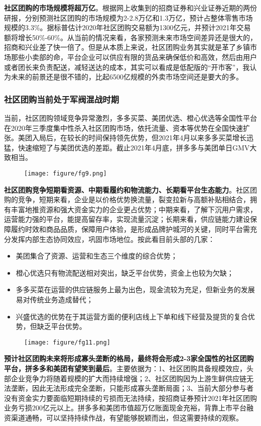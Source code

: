 \documentclass[UTF8,a4paper,12pt,lang=cn,fontset = windows]{elegantpaper} %
\begin{document}
\textbf{社区团购的市场规模将超万亿}。根据网上收集到的招商证券和兴业证券近期的两份研报，分别预测社区团购的市场规模为2-2.8万亿和1.3万亿，预计占整体零售市场规模的3.3\%。据标普估计2020年社区团购交易额为1300亿元，并预计2021年交易额将增长50\%-60\%。从当前的情况来看，各家预测未来市场空间差异还是很大的，招商和兴业差了快一倍了。但是从本质上来说，社区团购业务其实就是革了乡镇市场那些小卖部的命，平台企业可以供应有限的货品来确保低价和高效，然后由用户或者团长来负责配送，减轻送达的成本，其实可以看成是低配版的“开市客”，我认为未来的前景还是很不错的，比起6500亿规模的外卖市场空间还是要大的多。
\subsubsection{社区团购当前处于军阀混战时期}
当前，社区团购领域竞争异常激烈，多多买菜、美团优选、橙心优选等全国性平台在2020年三季度集中性杀入社区团购市场，依托流量、资本等优势在全国快速扩张。美团入局后，在较长的时间保持领先优势，但2021年4月以来多多买菜增长迅猛，快速缩短了与美团优选的差距。截止2021年4月底，拼多多与美团单日GMV大致相当。

\begin{figure}[htbp]
  \centering
  \texttt{[image: figure/fg9.png]}
  \end{figure}

\textbf{社区团购竞争短期看资源、中期看履约和物流能力、长期看平台生态能力}。社区团购的竞争，短期来看，企业是以价格优势换流量，裂变拉新与高额补贴相结合，拥有丰富地推资源和强大资金实力的企业更占优势；中期来看，了解下沉用户需求，运营能力强的平台，能提高留存率，实现流量沉淀；长期来看，供应链能力建设保障履约时效和商品品质，保障用户体验，是形成品牌护城河的关键，同时平台需充分发挥内部生态协同效应，巩固市场地位。按此看目前头部的几家：

\begin{itemize}
  \item 美团集合了资源、运营和生态三个维度的综合优势；
  \item 橙心优选只有物流配送相对突出，缺乏平台优势，资金上也较为欠缺；
  \item 多多买菜在运营的供应链服务上最为出色，现金流较为充足，但新业务的发展易对传统业务造成替代；
  \item 兴盛优选的优势在于其运营方面的便利店线上下单和线下经营及提货的复合优势，但缺乏平台优势。
  \end{itemize}
  
  \begin{figure}[htbp]
    \centering
    \texttt{[image: figure/fg11.png]}
    \end{figure}
\textbf{预计社区团购未来将形成寡头垄断的格局，最终将会形成2-3家全国性的社区团购平台，拼多多和美团有望笑到最后}。主要依据为：1、社区团购具备规模效应，头部企业竞争力将随着规模的扩大而持续增强；2、社区团购因为上游生鲜供应链无法垄断，因此无法形成完全垄断，只能形成寡头垄断局面；3、当前大部分参与者没有资金实力要面临短期持续的亏损而无法持续，按招商证券预计2021年社区团购业务亏损200亿元以上。拼多多和美团市值超万亿账面现金充裕，背靠上市平台融资渠道通畅，可以坚持持续作战，有望能够脱颖而出，但这需要持续的观察。
\end{document}
